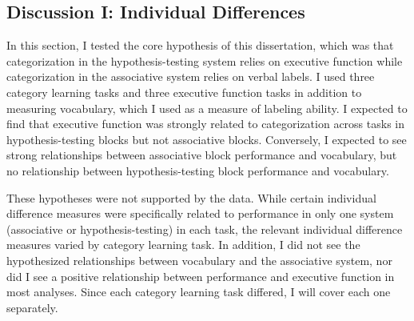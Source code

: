 \documentclass[../dissertation.tex]{subfiles}
\begin{document}
\subsection{Discussion I: Individual Differences}

	In this section, I tested the core hypothesis of this dissertation, which was that categorization in the hypothesis-testing system relies on executive function while categorization in the associative system relies on verbal labels. I used three category learning tasks and three executive function tasks in addition to measuring vocabulary, which I used as a measure of labeling ability. I expected to find that executive function was strongly related to categorization across tasks in hypothesis-testing blocks but not associative blocks. Conversely, I expected to see strong relationships between associative block performance and vocabulary, but no relationship between hypothesis-testing block performance and vocabulary. \par 
	These hypotheses were not supported by the data. While certain individual difference measures were specifically related to performance in only one system (associative or hypothesis-testing) in each task, the relevant individual difference measures varied by category learning task. In addition, I did not see the hypothesized relationships between vocabulary and the associative system, nor did I see a positive relationship between performance and executive function in most analyses. Since each category learning task differed, I will cover each one separately. \par
	
\end{document}
